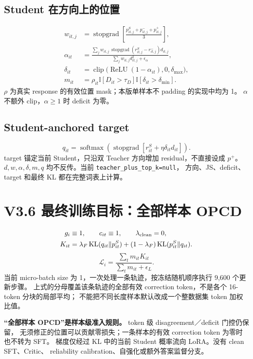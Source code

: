 \documentclass[11pt,a4paper]{ctexart}
\newcommand{\sg}{\operatorname{stopgrad}}
\newcommand{\softmax}{\operatorname{softmax}}
\newcommand{\KL}{\operatorname{KL}}
\newcommand{\clip}{\operatorname{clip}}
\newcommand{\relu}{\operatorname{ReLU}}
\newcommand{\Ind}{\mathbb{I}}
\begin{document}
\subsection{Student 在方向上的位置}
\begin{align}
 w_{it,j}&=\sg\left[\frac{p^S_{it,j}+p^-_{it,j}+p^+_{it,j}}{3}\right],\\
 \alpha_{it}&=\frac{\sum_j w_{it,j}\,\sg(r^S_{it,j}-r^-_{it,j})d_{it,j}}
 {\sum_jw_{it,j}d_{it,j}^2+\epsilon_\alpha},\\
 \delta_{it}&=\clip\bigl(\relu(1-\alpha_{it}),0,\delta_{\max}\bigr),\\
 m_{it}&=\rho_{it}\Ind[D_{it}>\tau_D]\Ind[\delta_{it}>\delta_{\min}].
\end{align}
$\rho$ 为真实 response 的有效位置 mask；本版单样本不 padding 的实现中均为 1。
$\alpha$ 不额外 clip，$\alpha\ge1$ 时 deficit 为零。

\subsection{Student-anchored target}
\begin{equation}
 \boxed{q_{it}=\softmax\!\left(\sg\left[r^S_{it}+\eta\delta_{it}d_{it}\right]\right).}
\end{equation}
target 锚定当前 Student，只沿双 Teacher 方向增加 residual，不直接设成 $p^+$。
$d,w,\alpha,\delta,m,q$ 均不反传。当前 \texttt{teacher\_plus\_top\_k=null}，
方向、JS、deficit、target 和最终 KL 都在完整词表上计算。

\section{V3.6 最终训练目标：全部样本 OPCD}
\begin{align}
 g_i&\equiv1,\qquad c_{it}\equiv1,\qquad \lambda_{\rm clean}=0,\\
 K_{it}&=\lambda_F\KL(q_{it}\Vert p^S_{it})
          +(1-\lambda_F)\KL(p^S_{it}\Vert q_{it}).
\end{align}
\begin{equation}
 \boxed{\mathcal L_i=\frac{\sum_t m_{it}K_{it}}{\sum_t m_{it}+\epsilon_L}.}
\end{equation}
当前 micro-batch size 为 1，一次处理一条轨迹，按冻结随机顺序执行 9,600 个更新步骤。
上式的分母覆盖该条轨迹的全部有效 correction token，不是各个 16-token 分块的局部平均；
不能把不同长度样本默认改成一个整数据集 token 加权比值。

\textbf{“全部样本 OPCD”是样本级准入规则。} token 级 disagreement／deficit 门控仍保留，
无须修正的位置可以贡献零损失；一条样本的有效 correction token 为零时也不转为 SFT。
梯度仅经过 KL 中的当前 Student 概率流向 LoRA。没有 clean SFT、Critic、
reliability calibration、自强化或额外答案监督分支。
\end{document}
